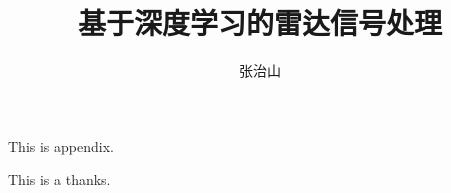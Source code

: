 \documentclass[twoside]{nputhesis}
\title[Radar Signal Process Based on Deep Learning]{基于深度学习的雷达信号处理}
\author[Zhishan Zhang]{张治山}
\begin{document}
\makecover
\frontmatter





\tableofcontents 

\mainmatter







\backmatter



\Appendix
This is appendix.

\Thanks
This is a thanks.

\Work

\statement
\end{document}
